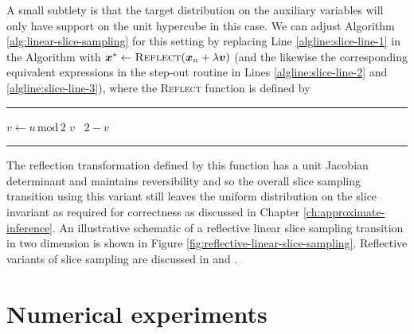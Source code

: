 A small subtlety is that the target distribution on the auxiliary variables will only have support on the unit hypercube in this case. We can adjust Algorithm \ref{alg:linear-slice-sampling} for this setting by replacing Line \ref{algline:slice-line-1} in the Algorithm with $\boldsymbol{x}^* \gets \textsc{Reflect}(\boldsymbol{x}_n + \lambda \boldsymbol{v})$ (and the likewise the corresponding equivalent expressions in the step-out routine in Lines \ref{algline:slice-line-2} and \ref{algline:slice-line-3}), where the \textsc{Reflect} function is defined by 
{
\vspace{5mm}
\hrule
\small
\vspace{1mm}
\begin{algorithmic}
    \State $v \gets u \,\textrm{mod}\, 2$
     \Return $v$
    \Else ~\Return $2 - v$
    \EndIf
  \EndFunction
\end{algorithmic}
\vspace{2mm}
\hrule
\vspace{3mm}
}
The reflection transformation defined by this function has a unit Jacobian determinant and maintains reversibility and so the overall slice sampling transition using this variant still leaves the uniform distribution on the slice invariant as required for correctness as discussed in Chapter \ref{ch:approximate-inference}. An illustrative schematic of a reflective linear slice sampling transition in two dimension is shown in Figure \ref{fig:reflective-linear-slice-sampling}. Reflective variants of slice sampling are discussed in \citep{neal2003slice} and \citep{downs2000nonnegative}.



\section{Numerical experiments}

